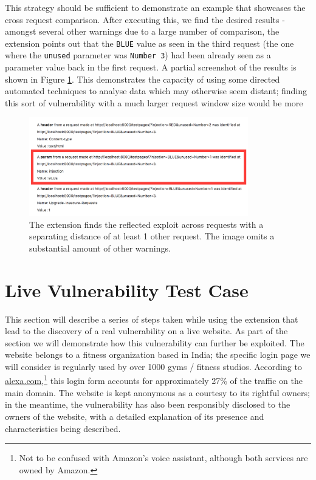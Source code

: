 This strategy should be sufficient to demonstrate an example that showcases the cross request comparison. After executing this, we find the desired results - amongst several other warnings due to a large number of comparison, the extension points out that the \texttt{BLUE} value as seen in the third request (the one where the \texttt{unused} parameter was \texttt{Number 3}) had been already seen as a parameter value back in the first request. A partial screenshot of the results is shown in Figure \ref{fig:cross_check_warnings}. This demonstrates the capacity of using some directed automated techniques to analyse data which may otherwise seem distant; finding this sort of vulnerability with a much larger request window size would be more 

\begin{figure}[h!]
	\centering
	\includegraphics[width=0.85\textwidth]{images/cross_request_warnings.png}
	\caption{The extension finds the reflected exploit across requests with a separating distance of at least 1 other request. The image omits a substantial amount of other warnings.}
	\label{fig:cross_check_warnings}
\end{figure}

\newpage
\section{Live Vulnerability Test Case} \label{live_vulnerability}

This section will describe a series of steps taken while using the extension that lead to the discovery of a real vulnerability on a live website. As part of the section we will demonstrate how this vulnerability can further be exploited. The website belongs to a fitness organization based in India; the specific login page we will consider is regularly used by over 1000 gyms / fitness studios. According to \url{alexa.com},\footnote{Not to be confused with Amazon's voice assistant, although both services are owned by Amazon.} this login form accounts for approximately 27\% of the traffic on the main domain. The website is kept anonymous as a courtesy to its rightful owners; in the meantime, the vulnerability has also been responsibly disclosed to the owners of the website, with a detailed explanation of its presence and characteristics being described. \\ 

